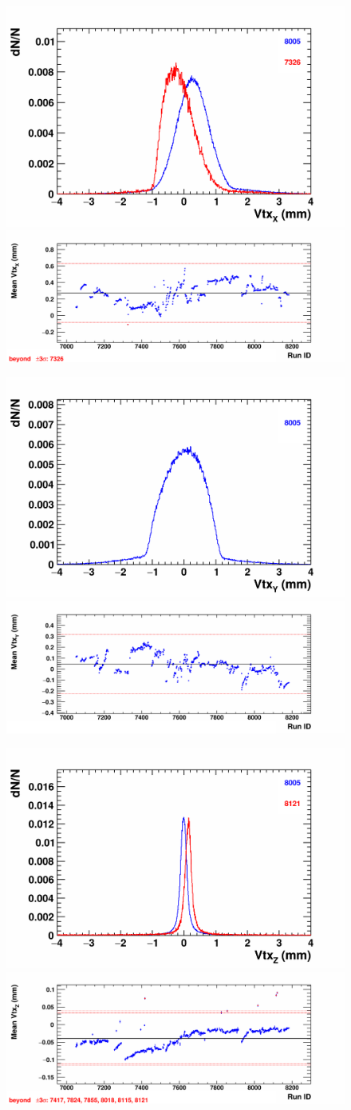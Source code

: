     \begin{figure}[H]
        \begin{center}
            \includegraphics[width=0.35\linewidth]{../pict/QA_RunByRun_24.12/H1/nVtxTr_h2_RunId_vtx_x.png}
            \includegraphics[width=0.60\linewidth]{../pict/QA_RunByRun_24.12/nVtxTr_h2_RunId_vtx_x.png}

            \includegraphics[width=0.35\linewidth]{../pict/QA_RunByRun_24.12/H1/nVtxTr_h2_RunId_vtx_y.png}
            \includegraphics[width=0.60\linewidth]{../pict/QA_RunByRun_24.12/nVtxTr_h2_RunId_vtx_y.png}

            \includegraphics[width=0.35\linewidth]{../pict/QA_RunByRun_24.12/H1/nVtxTr_h2_RunId_vtx_z.png}
            \includegraphics[width=0.60\linewidth]{../pict/QA_RunByRun_24.12/nVtxTr_h2_RunId_vtx_z.png}


\end{center}
\end{figure}
